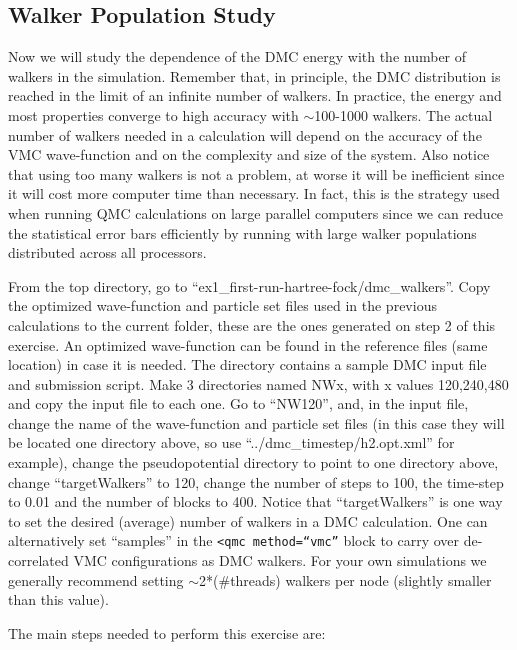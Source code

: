 \subsection{Walker Population Study}
Now we will study the dependence of the DMC energy with the number of walkers in the
simulation. Remember that, in principle, the DMC distribution is reached in the limit of
an infinite number of walkers. In practice, the energy and most properties converge to high
accuracy with $\sim$100-1000 walkers. The actual number of walkers needed in a calculation
will depend on the accuracy of the VMC wave-function and on the complexity and size of
the system. Also notice that using too many walkers is not a problem, at worse it will be
inefficient since it will cost more computer time than necessary. In fact, this is the strategy
used when running QMC calculations on large parallel computers since we can reduce the
statistical error bars efficiently by running with large walker populations distributed across
all processors.

From the top directory, go to ``ex1\_first-run-hartree-fock/dmc\_walkers''. Copy the
optimized wave-function and particle set files used in the previous calculations to the current
folder, these are the ones generated on step 2 of this exercise. An optimized wave-function can be found in the reference files (same location) in case it is needed. The directory
contains a sample DMC input file and submission script. Make 3 directories named NWx,
with x values 120,240,480 and copy the input file to each one. Go
to ``NW120'', and, in the input file, change the name of the wave-function and particle set
files (in this case they will be located one directory above, so use ``../dmc\_timestep/h2.opt.xml'' for
example), change the pseudopotential directory to point to one directory above, change ``targetWalkers'' to 120, change the number of steps to 100, the time-step
to 0.01 and the number of blocks to 400. Notice that ``targetWalkers'' is one way to set the desired (average) number of walkers in a DMC calculation. One can alternatively set ``samples'' in the \texttt{<qmc method=``vmc''} block to carry over de-correlated VMC configurations as DMC walkers. For your own simulations we generally recommend setting $\sim$2*(\#threads)
walkers per node (slightly smaller than this value).

The main steps needed to perform this exercise are:

